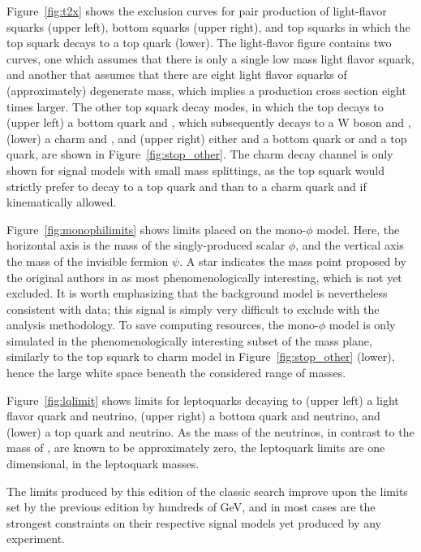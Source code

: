   Figure~\ref{fig:t2x} shows the exclusion curves for pair production of light-flavor squarks (upper left), bottom squarks (upper right), and top squarks in which the top squark decays to a top quark (lower). 
  The light-flavor figure contains two curves, one which assumes that there is only a single low mass light flavor squark, and another that assumes that there are eight light flavor squarks of (approximately) degenerate mass, which implies a production cross section eight times larger.
  The other top squark decay modes, in which the top decays to (upper left) a bottom quark and \chargino, which subsequently decays to a W boson and \lsp, (lower) a charm and \lsp, and (upper right) either \chargino and a bottom quark or \lsp and a top quark, are shown in Figure~\ref{fig:stop_other}.
  The charm decay channel is only shown for signal models with small mass splittings, as the top squark would strictly prefer to decay to a top quark and \lsp than to a charm quark and \lsp if kinematically allowed.

  Figure~\ref{fig:monophilimits} shows limits placed on the mono-$\phi$ model.
  Here, the horizontal axis is the mass of the singly-produced scalar $\phi$, and the vertical axis the mass of the invisible fermion $\psi$.
  A star indicates the mass point proposed by the original authors in \cite{monophi} as most phenomenologically interesting, which is not yet excluded.
  It is worth emphasizing that the background model is nevertheless consistent with data; this signal is simply very difficult to exclude with the \mttwo analysis methodology.
  To save computing resources, the mono-$\phi$ model is only simulated in the phenomenologically interesting subset of the mass plane, similarly to the top squark to charm model in Figure~\ref{fig:stop_other} (lower), hence the large white space beneath the considered range of masses.

  Figure~\ref{fig:lqlimit} shows limits for leptoquarks decaying to (upper left) a light flavor quark and neutrino, (upper right) a bottom quark and neutrino, and (lower) a top quark and neutrino.
  As the mass of the neutrinos, in contrast to the mass of \lsp, are known to be approximately zero, the leptoquark limits are one dimensional, in the leptoquark masses.

  The limits produced by this edition of the classic search improve upon the limits set by the previous edition \cite{MT2_2016} by hundreds of GeV, and in most cases are the strongest constraints on their respective signal models yet produced by any experiment.

